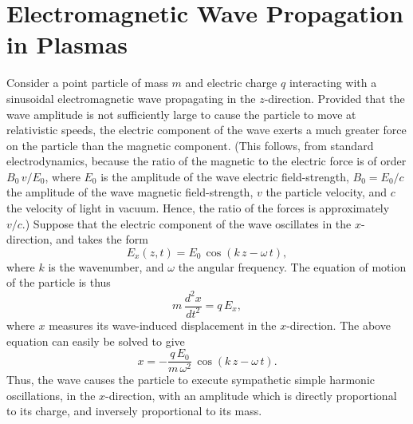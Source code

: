 \section{Electromagnetic Wave Propagation in Plasmas}\label{s9.2}
Consider a point particle of mass $m$ and electric charge $q$ interacting with a sinusoidal
electromagnetic wave propagating in the $z$-direction. Provided that the wave amplitude is not sufficiently large to
cause the particle to move at relativistic speeds, the electric
component of the wave exerts a much greater force on the particle than the magnetic
component. (This follows, from standard electrodynamics, because the ratio of the magnetic to the electric force is of order $B_0\,v/E_0$,
where $E_0$ is the amplitude of the wave electric field-strength, $B_0=E_0/c$ the amplitude of the
wave magnetic field-strength,  $v$ the particle velocity, and $c$ the velocity of light in vacuum. Hence, the ratio of the forces is approximately $v/c$.) Suppose that the electric component of the wave oscillates in the $x$-direction, and takes the form
\begin{equation}\label{e9.19}
E_x(z,t) = E_0\,\cos(k\,z-\omega\,t),
\end{equation}
where $k$ is the wavenumber, and $\omega$ the angular frequency.
The equation of motion of the particle is thus
\begin{equation}\label{e9.20}
m\,\frac{d^2 x}{dt^2} = q\,E_x,
\end{equation}
where $x$ measures its wave-induced displacement in the $x$-direction.
The above equation can easily be solved to give
\begin{equation}\label{e9.21}
x = -\frac{q\,E_0}{m\,\omega^2}\,\cos(k\,z-\omega\,t).
\end{equation}
Thus, the wave causes the particle to execute sympathetic simple harmonic
oscillations, in the $x$-direction, with an amplitude which is directly proportional to  its charge,
and inversely proportional to its mass.

